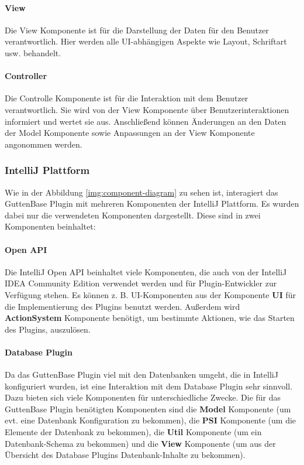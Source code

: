 	\paragraph*{View}
	Die View Komponente ist für die Darstellung der Daten für den Benutzer verantwortlich. Hier werden alle UI-abhängigen Aspekte wie Layout, Schriftart usw. behandelt.\\
	
	\paragraph*{Controller}
	Die Controlle Komponente ist für die Interaktion mit dem Benutzer verantwortlich. Sie wird von der View Komponente über Benutzerinteraktionen informiert und wertet sie aus. Anschließend können Änderungen an den Daten der Model Komponente sowie Anpassungen an der View Komponente angonommen werden.
	
	\subsubsection{IntelliJ Plattform}
	Wie in der Abbildung \ref{img:component-diagram} zu sehen ist, interagiert das GuttenBase Plugin mit mehreren Komponenten der IntelliJ Plattform. 
	Es wurden dabei nur die verwendeten Komponenten dargestellt. Diese sind in zwei Komponenten beinhaltet:
	
	\paragraph*{Open API}
	Die IntelliJ Open API beinhaltet viele Komponenten, die auch von der IntelliJ IDEA Community Edition verwendet werden und für Plugin-Entwickler zur Verfügung stehen. Es können z. B. UI-Komponenten aus der Komponente \textbf{UI} für die Implementierung des Plugins benutzt werden. Außerdem wird \textbf{ActionSystem} Komponente benötigt, um bestimmte Aktionen, wie das Starten des Plugins, auszulösen.
	\paragraph*{Database Plugin}
	Da das GuttenBase Plugin viel mit den Datenbanken umgeht, die in IntelliJ konfiguriert wurden, ist eine Interaktion mit dem Database Plugin sehr sinnvoll. Dazu bieten sich viele Komponenten für unterschiedliche Zwecke. Die für das GuttenBase Plugin benötigten Komponenten sind die \textbf{Model} Komponente (um evt. eine Datenbank Konfiguration zu bekommen), die \textbf{PSI} Komponente (um die Elemente der Datenbank zu bekommen), die \textbf{Util} Komponente (um ein Datenbank-Schema zu bekommen) und die \textbf{View} Komponente (um aus der Übersicht des Database  Plugins Datenbank-Inhalte zu bekommen).
	
